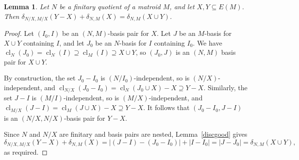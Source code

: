 \documentclass{amsart}
\theoremstyle{plain}
\newtheorem{lemma}[theorem]{Lemma}
\theoremstyle{definition}
\DeclareMathOperator{\cl}{cl}
\newcommand{\con}{/}
\renewcommand{\le}{\leqslant}
\renewcommand{\ss}{\subseteq}
\begin{document}
\begin{lemma}\label{disccontract}
  Let $N$ be a finitary quotient of a matroid $M$, and let $X, Y \ss E(M)$. 
  Then $\delta_{N \con X, M \con X}(Y-X) + \delta_{N,M}(X) = \delta_{N,M}(X \cup Y)$. 
\end{lemma}
\begin{proof}
  Let $(I_0,I)$ be an $(N,M)$-basis pair for $X$. Let $J$ be an $M$-basis for $X \cup Y$ containing $I$, 
  and let $J_0$ be an $N$-basis for $I$ containing $I_0$. We have $\cl_N(J_0) = \cl_N(I) \supseteq \cl_M(I) \supseteq X \cup Y$, 
  so $(J_0, J)$ is an $(N,M)$ basis pair for $X \cup Y$. 

  By construction, the set $J_0 - I_0$ is $(N \con I_0)$-independent, so is $(N \con X)$-independent, 
  and $\cl_{N \con X}(J_0 - I_0) = \cl_N(J_0 \cup X) - X \supseteq Y - X$. 
  Similarly, the set $J - I$ is $(M \con I)$-independent, so is $(M \con X)$-independent, 
  and $\cl_{M \con X}(J - I) = \cl_M(J \cup X) - X \supseteq Y-X$. 
  It follows that $(J_0-I_0, J-I)$ is an $(N \con X, N \con X)$-basis pair for $Y-X$. 

  Since $N$ and $N \con X$ are finitary and basis pairs are nested, Lemma~\ref{discgood} gives
  \[\delta_{N \con X, M \con X}(Y-X) + \delta_{N,M}(X) = |(J - I) - (J_0 - I_0)| + |I - I_0| = |J - J_0| = \delta_{N,M}(X \cup Y),\]  
  as required. 
\end{proof}

\end{document}

